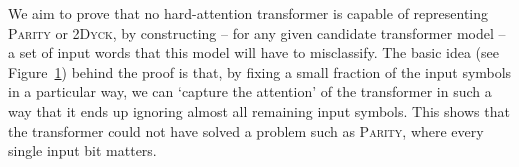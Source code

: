 \documentclass[11pt,a4paper]{article}
\begin{document}
\begin{figure}[ht]
{	}
	\label{fig:depth-reduction}
\end{figure}

We aim to prove that no hard-attention transformer is capable of representing \textsc{Parity} or \textsc{2Dyck}, by constructing -- for any given candidate transformer model -- a set of input words that this model will have to misclassify.
The basic idea (see Figure~\ref{fig:depth-reduction}) behind the proof is that, by fixing a small fraction of the input symbols in a particular way, we can `capture the attention' of the transformer in such a way that it ends up ignoring almost all remaining input symbols.
This shows that the transformer could not have solved a problem such as \textsc{Parity}, where every single input bit matters. %




\end{document}
